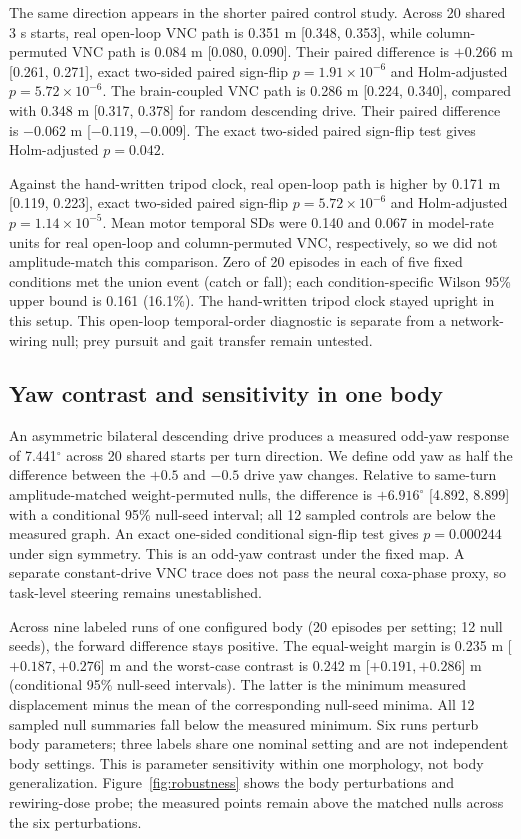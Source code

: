 \documentclass[conference]{IEEEtran}
\begin{document}
The same direction appears in the shorter paired control study. Across 20 shared 3 s starts, real open-loop VNC path is 0.351 m [0.348, 0.353], while column-permuted VNC path is 0.084 m [0.080, 0.090]. Their paired difference is $+0.266$ m [0.261, 0.271], exact two-sided paired sign-flip $p=1.91\times10^{-6}$ and Holm-adjusted $p=5.72\times10^{-6}$. The brain-coupled VNC path is 0.286 m [0.224, 0.340], compared with 0.348 m [0.317, 0.378] for random descending drive. Their paired difference is $-0.062$ m [$-0.119,-0.009$]. The exact two-sided paired sign-flip test gives Holm-adjusted $p=0.042$.

Against the hand-written tripod clock, real open-loop path is higher by 0.171 m [0.119, 0.223], exact two-sided paired sign-flip $p=5.72\times10^{-6}$ and Holm-adjusted $p=1.14\times10^{-5}$. Mean motor temporal SDs were 0.140 and 0.067 in model-rate units for real open-loop and column-permuted VNC, respectively, so we did not amplitude-match this comparison. Zero of 20 episodes in each of five fixed conditions met the union event (catch or fall); each condition-specific Wilson 95\% upper bound is 0.161 (16.1\%). The hand-written tripod clock stayed upright in this setup. This open-loop temporal-order diagnostic is separate from a network-wiring null; prey pursuit and gait transfer remain untested.

\subsection{Yaw contrast and sensitivity in one body}
An asymmetric bilateral descending drive produces a measured odd-yaw response of 7.441$^{\circ}$ across 20 shared starts per turn direction. We define odd yaw as half the difference between the $+0.5$ and $-0.5$ drive yaw changes. Relative to same-turn amplitude-matched weight-permuted nulls, the difference is $+6.916^{\circ}$ [4.892, 8.899] with a conditional 95\% null-seed interval; all 12 sampled controls are below the measured graph. An exact one-sided conditional sign-flip test gives $p=0.000244$ under sign symmetry. This is an odd-yaw contrast under the fixed map. A separate constant-drive VNC trace does not pass the neural coxa-phase proxy, so task-level steering remains unestablished.

Across nine labeled runs of one configured body (20 episodes per setting; 12 null seeds), the forward difference stays positive. The equal-weight margin is 0.235 m [$+0.187,+0.276$] m and the worst-case contrast is 0.242 m [$+0.191,+0.286$] m (conditional 95\% null-seed intervals). The latter is the minimum measured displacement minus the mean of the corresponding null-seed minima. All 12 sampled null summaries fall below the measured minimum. Six runs perturb body parameters; three labels share one nominal setting and are not independent body settings. This is parameter sensitivity within one morphology, not body generalization. Figure~\ref{fig:robustness} shows the body perturbations and rewiring-dose probe; the measured points remain above the matched nulls across the six perturbations.
\end{document}

